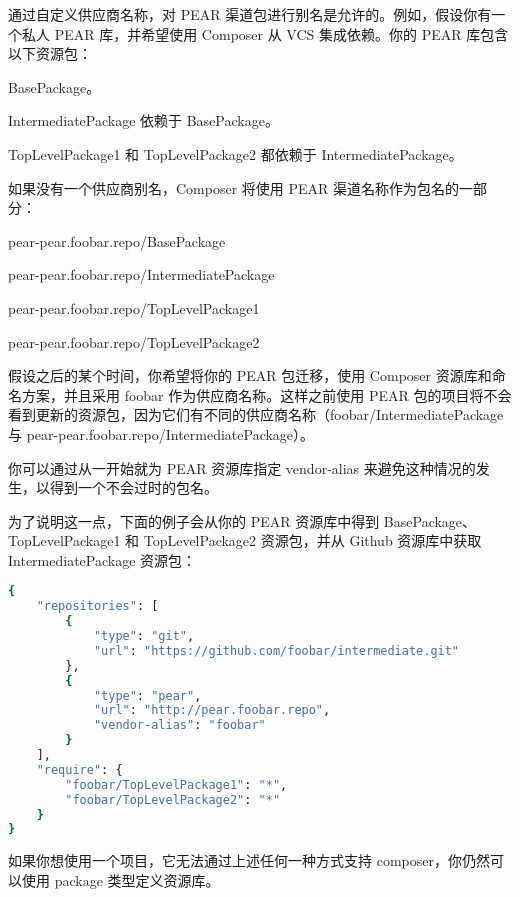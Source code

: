 通过自定义供应商名称，对 PEAR 渠道包进行别名是允许的。例如，假设你有一个私人 PEAR 库，并希望使用 Composer 从 VCS 集成依赖。你的 PEAR 库包含以下资源包：

\begin{compactitem}
\item BasePackage。
\item IntermediatePackage 依赖于 BasePackage。
\item TopLevelPackage1 和 TopLevelPackage2 都依赖于 IntermediatePackage。
\end{compactitem}

如果没有一个供应商别名，Composer 将使用 PEAR 渠道名称作为包名的一部分：

\begin{compactitem}
\item pear-pear.foobar.repo/BasePackage
\item pear-pear.foobar.repo/IntermediatePackage
\item pear-pear.foobar.repo/TopLevelPackage1
\item pear-pear.foobar.repo/TopLevelPackage2
\end{compactitem}

假设之后的某个时间，你希望将你的 PEAR 包迁移，使用 Composer 资源库和命名方案，并且采用 foobar 作为供应商名称。这样之前使用 PEAR 包的项目将不会看到更新的资源包，因为它们有不同的供应商名称（foobar/IntermediatePackage 与 pear-pear.foobar.repo/IntermediatePackage）。

你可以通过从一开始就为 PEAR 资源库指定 vendor-alias 来避免这种情况的发生，以得到一个不会过时的包名。

为了说明这一点，下面的例子会从你的 PEAR 资源库中得到 BasePackage、TopLevelPackage1 和 TopLevelPackage2 资源包，并从 Github 资源库中获取 IntermediatePackage 资源包：



\begin{lstlisting}[language=bash]
{
    "repositories": [
        {
            "type": "git",
            "url": "https://github.com/foobar/intermediate.git"
        },
        {
            "type": "pear",
            "url": "http://pear.foobar.repo",
            "vendor-alias": "foobar"
        }
    ],
    "require": {
        "foobar/TopLevelPackage1": "*",
        "foobar/TopLevelPackage2": "*"
    }
}
\end{lstlisting}

如果你想使用一个项目，它无法通过上述任何一种方式支持 composer，你仍然可以使用 package 类型定义资源库。

